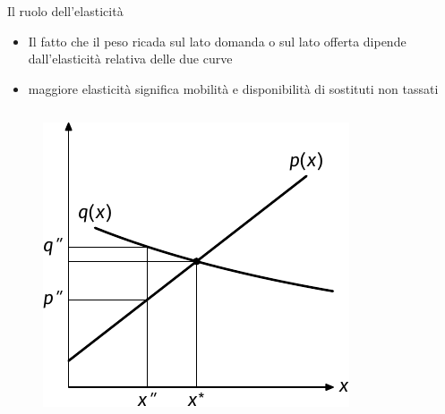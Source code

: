 \documentclass[aspectratio=64,11pt]{beamer}
\begin{document}
\begin{frame}{Il ruolo dell'elasticità}
\begin{itemize}
\item Il fatto che il peso ricada sul lato domanda o sul lato offerta dipende
dall'elasticità relativa delle due curve
\item maggiore elasticità significa mobilità e disponibilità di sostituti non
tassati
\end{itemize}

\begin{columns}
\begin{column}{.45\columnwidth}
\begin{figure}[htbp]
\centering
\includegraphics[width=\textwidth]{./figure/incidenza-5.pdf}
\end{figure}
\end{column}


\end{columns}
\end{frame}
\end{document}
